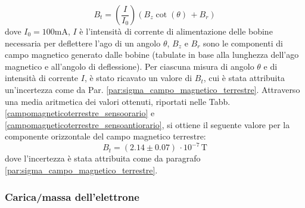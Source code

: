 \documentclass[]{article}
\begin{document}
    \begin{equation}
        \label{mag_terr}
        B_t= \left(\frac{I}{I_0}\right) (B_z \cot(\theta) \, + B_r)
    \end{equation}
    dove $ I_0 = 100 \text{mA} $, $ I $ è l'intensità di corrente di alimentazione delle bobine necessaria per deflettere l'ago di un angolo $\theta $, $B_z$ e $B_r$ sono le componenti di campo magnetico generato dalle bobine (tabulate in base alla lunghezza dell'ago magnetico e all'angolo di deflessione). Per ciascuna misura di angolo $\theta$ e di intensità di corrente $I$, è stato ricavato un valore di $B_t$, cui è stata attribuita un'incertezza come da Par. \ref{par:sigma_campo_magnetico_terrestre}. 
    Attraverso una media aritmetica dei valori ottenuti, riportati nelle Tabb. \ref{campomagneticoterrestre_sensoorario} e \ref{campomagneticoterrestre_sensoantiorario}, si ottiene il seguente valore per la componente orizzontale del campo magnetico terrestre:
    \begin{equation}
        \label{misura_campomagneticoterrestre}
        B_t = ( 2.14\pm 0.07) \, \cdot 10^{-7} \, \text{T}
    \end{equation}
    dove l'incertezza è stata attribuita come da paragrafo \ref{par:sigma_campo_magnetico_terrestre}. \\
    \label{par:campo_magnetico_terrestre}

    \subsubsection{Carica/massa dell'elettrone}
\end{document}
